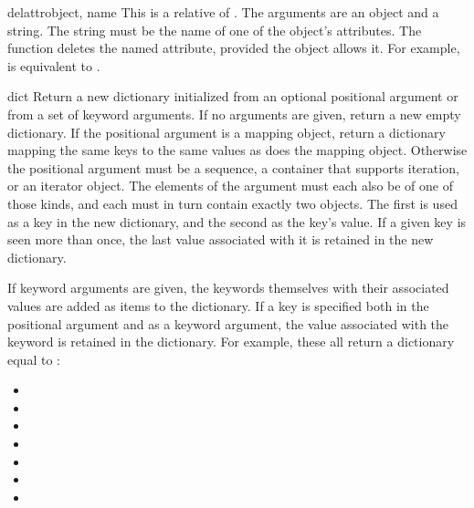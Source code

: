 \begin{funcdesc}{delattr}{object, name}
  This is a relative of .  The arguments are an
  object and a string.  The string must be the name
  of one of the object's attributes.  The function deletes
  the named attribute, provided the object allows it.  For example,
   is equivalent to
  .
\end{funcdesc}

\begin{funcdesc}{dict}{}
  Return a new dictionary initialized from an optional positional
  argument or from a set of keyword arguments.
  If no arguments are given, return a new empty dictionary.
  If the positional argument is a mapping object, return a dictionary
  mapping the same keys to the same values as does the mapping object.
  Otherwise the positional argument must be a sequence, a container that
  supports iteration, or an iterator object.  The elements of the argument
  must each also be of one of those kinds, and each must in turn contain
  exactly two objects.  The first is used as a key in the new dictionary,
  and the second as the key's value.  If a given key is seen more than
  once, the last value associated with it is retained in the new
  dictionary.

  If keyword arguments are given, the keywords themselves with their
  associated values are added as items to the dictionary. If a key
  is specified both in the positional argument and as a keyword argument,
  the value associated with the keyword is retained in the dictionary.
  For example, these all return a dictionary equal to
  :

  \begin{itemize}
    \item {}
    \item {}
    \item {}
    \item {}
    \item {}
    \item {}
    \item {}
  \end{itemize}

\end{funcdesc}

